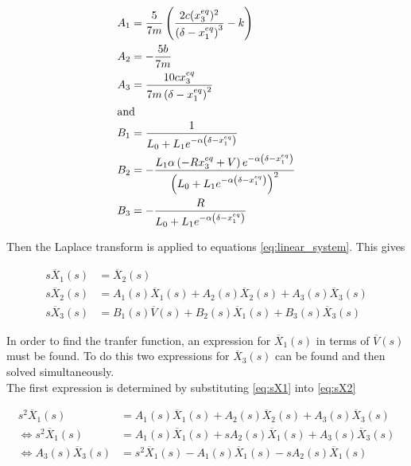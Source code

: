 \documentclass[a4paper,10pt,reqno]{amsart}
\numberwithin{equation}{section}
\begin{document}
\begin{subequations} \label{eq:SysLT}
    \begin{align}
         A_1 &= \frac{5}{7 m}\left(\frac{2 c (x_{3}^{eq})^{2}}{\left(\delta - x_{1}^{eq}\right)^{3}} - k\right) \label{eq:A1} \\
         A_2 &= -\frac{5 b}{7 m} \label{eq:A2} \\
         A_3 &= \frac{10 c x_{3}^{eq}}{7 m \left(\delta - x_{1}^{eq}\right)^{2}} \label{eq:A3} \\
         \intertext{and}
         B_1 &= \frac{1}{L_{0} + L_{1} e^{- \alpha \left(\delta - x_{1}^{eq}\right)}} \label{eq:B1} \\
         B_2 &= - \frac{L_{1} \alpha \left(- R x_{3}^{eq} + V\right) e^{- \alpha \left(\delta - x_{1}^{eq}\right)}}{\left(L_{0} + L_{1} e^{- \alpha \left(\delta - x_{1}^{eq}\right)}\right)^{2}} \label{eq:B2} \\
         B_3 &= - \frac{R}{L_{0} + L_{1} e^{- \alpha \left(\delta - x_{1}^{eq}\right)}} \label{eq:B3}
    \end{align}
\end{subequations}
\vspace{1pt}

Then the Laplace transform is applied to equations \ref{eq:linear_system}. This gives

\begin{subequations} \label{eq:SysLT}
    \begin{align}
         s\overline{X}_1(s) &= \overline{X}_2(s) \label{eq:sX1} \\
         s\overline{X}_2(s) &= A_1(s)\overline{X}_1(s) + A_2(s)\overline{X}_2(s) + A_3(s)\overline{X}_3(s) \label{eq:sX2} \\
         s\overline{X}_3(s) &= B_1(s)\overline{V}(s) + B_2(s)\overline{X}_1(s) + B_3(s)\overline{X}_3(s) \label{eq:sX4}
    \end{align}
\end{subequations}
\vspace{1pt}

In order to find the tranfer function, an expression for $\overline{X}_1(s)$ in terms of $\overline{V}(s)$ must be found. To do this two expressions for $\overline{X}_3(s)$ can be found and then solved simultaneously.\\
The first expression is determined by substituting \ref{eq:sX1} into \ref{eq:sX2}

\begin{align*}
     s^2\overline{X}_1(s) &= A_1(s)\overline{X}_1(s) + A_2(s)\overline{X}_2(s) + A_3(s)\overline{X}_3(s) \\
     \iff s^2\overline{X}_1(s) &= A_1(s)\overline{X}_1(s) + sA_2(s)\overline{X}_1(s) + A_3(s)\overline{X}_3(s) \\
     \iff A_3(s)\overline{X}_3(s) &= s^2\overline{X}_1(s) - A_1(s)\overline{X}_1(s) - sA_2(s)\overline{X}_1(s)
\end{align*}
\vspace{1pt}
\end{document}
